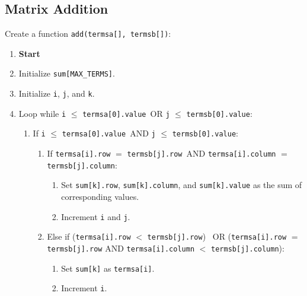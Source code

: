 \subsection{Matrix Addition}
Create a function \texttt{add(termsa[], termsb[])}:
\begin{enumerate}[label=\arabic*:,left=0pt]
  \item \textbf{Start}
  \item Initialize \texttt{sum[MAX\_TERMS]}.
  \item Initialize \texttt{i}, \texttt{j}, and \texttt{k}.
  \item Loop while \texttt{i} $\leq$ \texttt{termsa[0].value}\ OR \texttt{j} $\leq$ \texttt{termsb[0].value}:
        \begin{enumerate}[label=4.\arabic*:]
          \item If \texttt{i} $\leq$ \texttt{termsa[0].value}\ AND \texttt{j} $\leq$ \texttt{termsb[0].value}:
                \begin{enumerate}[label=4.1.\arabic*:]
                  \item If \texttt{termsa[i].row} $=$ \texttt{termsb[j].row}\ AND \texttt{termsa[i].column} $=$ \texttt{termsb[j].column}:
                        \begin{enumerate}[label=4.1.1.\arabic*:]
                          \item Set \texttt{sum[k].row}, \texttt{sum[k].column}, and \texttt{sum[k].value} as the sum of corresponding values.
                          \item Increment \texttt{i} and \texttt{j}.
                        \end{enumerate}

                  \item Else if (\texttt{termsa[i].row} $<$ \texttt{termsb[j].row}) \ OR (\texttt{termsa[i].row} $=$ \texttt{termsb[j].row} AND \texttt{termsa[i].column} $<$ \texttt{termsb[j].column}):
                        \begin{enumerate}[label=4.1.2.\arabic*:]
                          \item Set \texttt{sum[k]} as \texttt{termsa[i]}.
                          \item Increment \texttt{i}.
                        \end{enumerate}


\end{enumerate}
\end{enumerate}
\end{enumerate}
